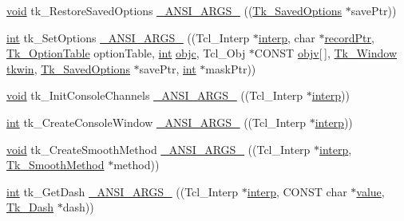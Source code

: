\begin{DoxyCompactItemize}
\item 
\hyperlink{tk_8h_aba408b7cd755a96426e004c015f5de8e}{void} tk\+\_\+\+Restore\+Saved\+Options \hyperlink{struct_tk_stubs_a6ee92dcbd32eb0d1666c2d13d27ae425}{\+\_\+\+A\+N\+S\+I\+\_\+\+A\+R\+G\+S\+\_\+} ((\hyperlink{struct_tk___saved_options}{Tk\+\_\+\+Saved\+Options} $\ast$save\+Ptr))
\item 
\hyperlink{tk_8h_a83f82f76e7fed06f4c49d2db94028a6d}{int} tk\+\_\+\+Set\+Options \hyperlink{struct_tk_stubs_a9a800b05abd8a58761116557c9a36cb3}{\+\_\+\+A\+N\+S\+I\+\_\+\+A\+R\+G\+S\+\_\+} ((Tcl\+\_\+\+Interp $\ast$\hyperlink{tk_8h_a5ab79c0f5849ee8e6a2e955a6c536cc0}{interp}, char $\ast$\hyperlink{tk_8h_ac9ba2e58d9bf54ae4b21855053aa52da}{record\+Ptr}, \hyperlink{tk_8h_ae181e27708067a6390bf088d8a17b5e1}{Tk\+\_\+\+Option\+Table} option\+Table, \hyperlink{tk_8h_a83f82f76e7fed06f4c49d2db94028a6d}{int} \hyperlink{tk_8h_aee01b275ba283bcf6685c7418eaac825}{objc}, Tcl\+\_\+\+Obj $\ast$C\+O\+N\+ST \hyperlink{tk_8h_af1de41a05d78e51286e10037e26edbb1}{objv}\mbox{[}$\,$\mbox{]}, \hyperlink{tk_8h_ab756137de3ee74edc2501bd0d761e37c}{Tk\+\_\+\+Window} \hyperlink{tk_8h_a35df722e7e1b6efd651683b8be7c1490}{tkwin}, \hyperlink{struct_tk___saved_options}{Tk\+\_\+\+Saved\+Options} $\ast$save\+Ptr, \hyperlink{tk_8h_a83f82f76e7fed06f4c49d2db94028a6d}{int} $\ast$mask\+Ptr))
\item 
\hyperlink{tk_8h_aba408b7cd755a96426e004c015f5de8e}{void} tk\+\_\+\+Init\+Console\+Channels \hyperlink{struct_tk_stubs_a7fba427d2b9252e62b95454fd409a6f7}{\+\_\+\+A\+N\+S\+I\+\_\+\+A\+R\+G\+S\+\_\+} ((Tcl\+\_\+\+Interp $\ast$\hyperlink{tk_8h_a5ab79c0f5849ee8e6a2e955a6c536cc0}{interp}))
\item 
\hyperlink{tk_8h_a83f82f76e7fed06f4c49d2db94028a6d}{int} tk\+\_\+\+Create\+Console\+Window \hyperlink{struct_tk_stubs_a9fbbba0d1cb3e013c2cae6f7e74f95ed}{\+\_\+\+A\+N\+S\+I\+\_\+\+A\+R\+G\+S\+\_\+} ((Tcl\+\_\+\+Interp $\ast$\hyperlink{tk_8h_a5ab79c0f5849ee8e6a2e955a6c536cc0}{interp}))
\item 
\hyperlink{tk_8h_aba408b7cd755a96426e004c015f5de8e}{void} tk\+\_\+\+Create\+Smooth\+Method \hyperlink{struct_tk_stubs_ae766928c0250b3e4f9ab5f765d8511d3}{\+\_\+\+A\+N\+S\+I\+\_\+\+A\+R\+G\+S\+\_\+} ((Tcl\+\_\+\+Interp $\ast$\hyperlink{tk_8h_a5ab79c0f5849ee8e6a2e955a6c536cc0}{interp}, \hyperlink{struct_tk___smooth_method}{Tk\+\_\+\+Smooth\+Method} $\ast$method))
\item 
\hyperlink{tk_8h_a83f82f76e7fed06f4c49d2db94028a6d}{int} tk\+\_\+\+Get\+Dash \hyperlink{struct_tk_stubs_afd6803c9d70e25201cc2fb12742e9329}{\+\_\+\+A\+N\+S\+I\+\_\+\+A\+R\+G\+S\+\_\+} ((Tcl\+\_\+\+Interp $\ast$\hyperlink{tk_8h_a5ab79c0f5849ee8e6a2e955a6c536cc0}{interp}, C\+O\+N\+ST char $\ast$\hyperlink{tk_8h_a177a0765f574ef6642002696d9cd82d0}{value}, \hyperlink{struct_tk___dash}{Tk\+\_\+\+Dash} $\ast$dash))

\end{DoxyCompactItemize}
